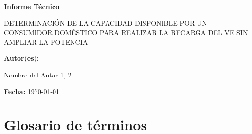 \documentclass[a4paper,12pt]{article}
\let\OldTextField\TextField
\renewcommand{\TextField}[2][]{%
  \raisebox{-0.1ex}{\OldTextField[height=.95em,  bordercolor={1 1 1}, backgroundcolor={1 1 1},#1]{#2}}%
}
\begin{document}
\begin{Form}



\begin{titlepage}
    \centering
    {\scshape\LARGE  \par}
    \vspace{1cm}
    {\Huge\bfseries Informe Técnico\par}
    \vspace{2cm}
    {\Large DETERMINACIÓN DE LA CAPACIDAD DISPONIBLE POR UN CONSUMIDOR
    DOMÉSTICO PARA REALIZAR LA RECARGA DEL VE SIN AMPLIAR LA POTENCIA\par}
    \vspace{1cm}
    \vfill
    \textbf{Autor(es):}\par
    Nombre del Autor 1,\TextField[name=Tecnico,width=4cm,default=Juan Pérez]{} 2\par
    \vspace{0.5cm}
    \textbf{Fecha:} \today \par
\end{titlepage}

\begin{abstract}
  El texto del resumen debe estar de acuerdo con la Norma UNE 50103. En síntesis, debe ser tan informativo como lo
  permita la naturaleza del documento, para que los lectores puedan decidir si es necesario leer el documento completo;
  debe definir el objetivo, métodos, resultados y conclusiones presentadas en el documento original, bien en ese orden,
  o destacando inicialmente los resultados y conclusiones; debe constituir un texto completo, para que sea inteligible sin
  necesidad de referirse al documento. Debe ser conciso sin ser oscuro, reteniendo la información básica y el carácter
  del documento original. Los resúmenes de la mayoría de los informes deben tener menos de 250 palabras y en ningún
  caso más de 500; Deben estar escritos en un solo párrafo; emplear normalmente frases completas, verbos en forma
  activa y con tercera persona. No se deben utilizar figuras y símbolos, tales como tablas cortas y fórmulas, más que
  cuando no haya ninguna alternativa aceptable.\end{abstract}

\tableofcontents

\section*{Glosario de términos}


\end{Form}
\end{document}
